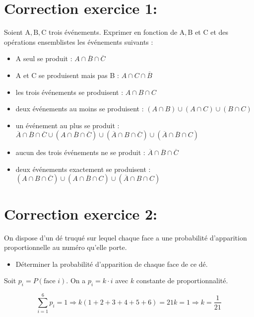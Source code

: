 \section*{Correction exercice 1:}

Soient \(\mathrm{A}, \mathrm{B}, \mathrm{C}\) trois événements. Exprimer en fonction de \(\mathrm{A}, \mathrm{B}\) et C et des opérations ensemblistes les événements suivants :

\begin{itemize}
    \item A seul se produit : \(A \cap \overline{B} \cap \overline{C}\)
    \item A et C se produisent mais pas B : \(A \cap C \cap \overline{B}\)
    \item les trois événements se produisent : \(A \cap B \cap C\)
    \item deux événements au moins se produisent : \((A \cap B) \cup (A \cap C) \cup (B \cap C)\)
    \item un événement au plus se produit : \(\overline{A} \cap \overline{B} \cap \overline{C} \cup (A \cap \overline{B} \cap \overline{C}) \cup (\overline{A} \cap B \cap \overline{C}) \cup (\overline{A} \cap \overline{B} \cap C)\)
    \item aucun des trois événements ne se produit : \(\overline{A} \cap \overline{B} \cap \overline{C}\)
    \item deux événements exactement se produisent : \((A \cap B \cap \overline{C}) \cup (A \cap \overline{B} \cap C) \cup (\overline{A} \cap B \cap C)\)
\end{itemize}

\section*{Correction exercice 2:}

On dispose d'un dé truqué sur lequel chaque face a une probabilité d'apparition proportionnelle au numéro qu'elle porte.

\begin{itemize}
\item Déterminer la probabilité d'apparition de chaque face de ce dé.
\end{itemize}

Soit \(p_i = P(\text{face } i)\). On a \(p_i = k \cdot i\) avec \(k\) constante de proportionnalité.

\[\sum_{i=1}^{6} p_i = 1 \Rightarrow k(1+2+3+4+5+6) = 21k = 1 \Rightarrow k = \frac{1}{21}\]

